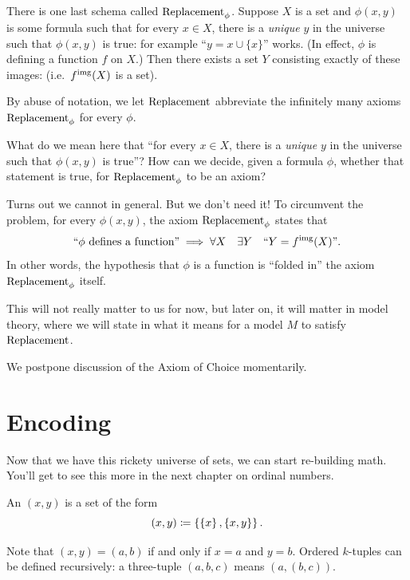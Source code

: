 There is one last schema called $\mathrm{Replacement}_\phi$.
Suppose $X$ is a set and $\phi(x,y)$ is some formula
such that for every $x \in X$, there is a \emph{unique} $y$ in the universe
such that $\phi(x,y)$ is true: for example ``$y = x \cup \{x\}$'' works.
(In effect, $\phi$ is defining a function $f$ on $X$.)
Then there exists a set $Y$ consisting exactly of these images:
(i.e.\ $f^{\text{img}}(X)$ is a set).
\begin{abuse}
	By abuse of notation, we let $\mathrm{Replacement}$ abbreviate
	the infinitely many axioms $\mathrm{Replacement}_\phi$ for every $\phi$.
\end{abuse}

\begin{remark}
	What do we mean here that ``for every $x \in X$, there is a \emph{unique} $y$ in the universe
	such that $\phi(x, y)$ is true''? How can we decide, given a formula $\phi$, whether that
	statement is true, for $\mathrm{Replacement}_\phi$ to be an axiom?

	Turns out we cannot in general. But we don't need it!
	To circumvent the problem, for every $\phi(x, y)$, the axiom $\mathrm{Replacement}_\phi$ states that
	\[
		\text{``$\phi$ defines a function''} \implies
		\forall X \quad \exists Y \quad \text{``$Y = f^{\text{img}}(X)$''}.
	\]
	In other words, the hypothesis that $\phi$ is a function is ``folded in'' the axiom
	$\mathrm{Replacement}_\phi$ itself.

	This will not really matter to us for now, but later on, it will matter in model theory,
	where we will state in  what it means for a model $M$ to
	satisfy $\mathrm{Replacement}$.
\end{remark}

We postpone discussion of the Axiom of Choice momentarily.

\section{Encoding}
Now that we have this rickety universe of sets, we can start re-building math.
You'll get to see this more in the next chapter on ordinal numbers.

\begin{definition}
	An  $(x,y)$
	is a set of the form
	\[ (x,y) \coloneqq
		\left\{ \left\{ x \right\}, \left\{ x,y \right\} \right\}. \]
\end{definition}
Note that $(x,y) = (a,b)$ if and only if $x=a$ and $y=b$.
Ordered $k$-tuples can be defined recursively: a three-tuple $(a,b,c)$ means $(a,(b,c))$.

